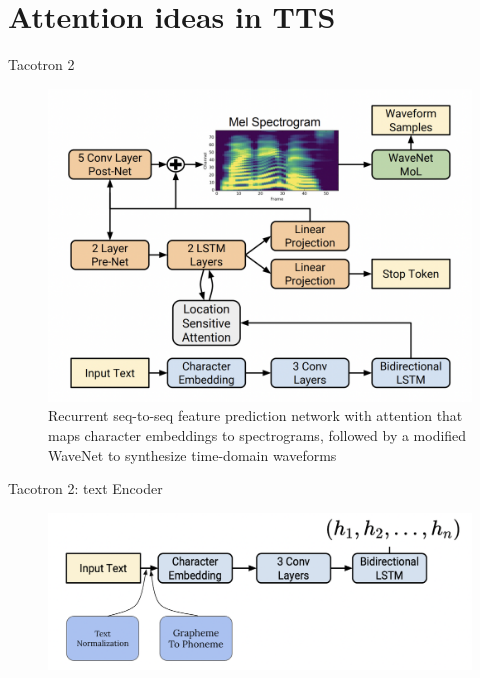 \section{Attention ideas in TTS}
\begin{frame}{Tacotron 2}
    \begin{figure}
    	\centering
    	\includegraphics[width=0.75\linewidth]{figs/tacotron2.png}
    	\caption{Recurrent seq-to-seq feature prediction network with attention that maps character embeddings to spectrograms, followed by a modified WaveNet to synthesize time-domain waveforms}
    \end{figure}
    

\end{frame}
\begin{frame}{Tacotron 2: text Encoder}
    \begin{figure}
    	\centering
    	\includegraphics[width=0.99\linewidth]{figs/tacotron_text_encoder.png}
    \end{figure}
    

    
\end{frame}

